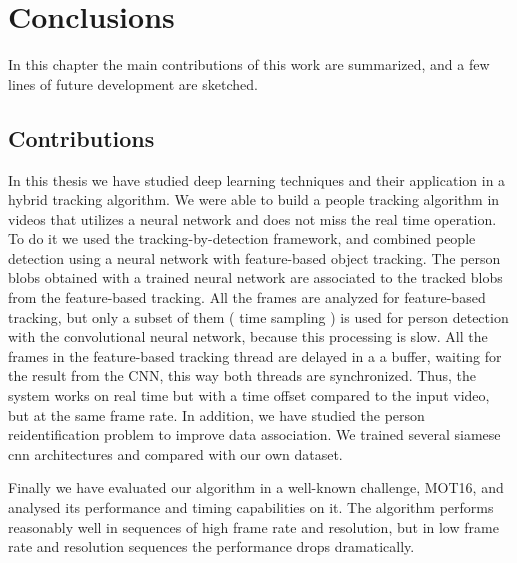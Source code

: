 \chapter{Conclusions}\label{cap.conclusions}


In this chapter the main contributions of this work are summarized, and a few lines of future development are sketched.

\section{Contributions}




In this thesis we have studied deep learning techniques and their application in a hybrid tracking algorithm. We were able to build a people tracking algorithm in videos that utilizes a neural network and does not miss the real time operation. To do it we used the tracking-by-detection framework, and combined people detection using a neural network with feature-based object tracking. The person blobs obtained with a trained neural network are associated to the tracked blobs from the feature-based tracking. All the frames are analyzed for feature-based tracking, but only a subset of them ( time sampling ) is used for person detection with the convolutional neural network, because this processing is slow. All the frames in the feature-based tracking thread are delayed in a a buffer, waiting for the result from the CNN, this way both threads are synchronized. Thus, the system works on real time but with a time offset compared to the input video, but at the same frame rate. In addition, we have studied the person reidentification problem to improve data association. We trained several siamese cnn architectures and compared with our own dataset.

Finally we have evaluated our algorithm in a well-known challenge, MOT16, and analysed its performance and timing capabilities on it. The algorithm performs reasonably well in sequences of high frame rate and resolution, but in low frame rate and resolution sequences the performance drops dramatically. 


